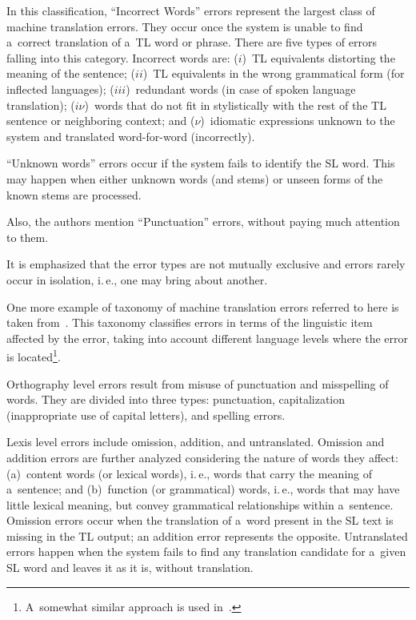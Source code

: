 \begin{multicols}{2}
  In this classification, ``Incorrect Words'' errors represent the largest class of 
machine translation errors. They occur once the system is unable to find a~correct 
translation of a~TL word or phrase. There are five types of errors falling into this 
category. Incorrect words are: ($i$)~TL equivalents distorting the meaning of the 
sentence; ($ii$)~TL equivalents in the wrong grammatical form (for inflected 
languages); ($iii$)~redundant words (in case of spoken language translation); 
($i\nu$)~words that do not fit in stylistically with the rest of the TL sentence or 
neighboring context; and ($\nu$)~idiomatic expressions unknown to the system and 
translated word-for-word (incorrectly).
{ %

}
  
  ``Unknown words'' errors occur if the system fails to identify the SL word. This 
may happen when either unknown words (and stems) or unseen forms of the known 
stems are processed.
  
  Also, the authors mention ``Punctuation'' errors, without paying much attention 
to them.
  
  It is emphasized that the error types are not mutually exclusive and errors rarely 
occur in isolation, i.\,e., one may bring about another.
  
  One more example of taxonomy of machine translation errors  referred to here is 
taken from~\cite{14-n}. This taxonomy classifies errors in terms of the linguistic 
item affected by the error, taking into account different language levels where the 
error is located\footnote{A~somewhat similar approach is used in~\cite{15-n}.}.
  
  Orthography level errors result from misuse of punctuation and misspelling of 
words. They are divided into three types: punctuation, capitalization (inappropriate 
use of capital letters), and spelling errors.
  
  Lexis level errors include omission, addition, and untranslated. Omission and 
addition errors are further analyzed considering the nature of words they affect: 
(a)~content words (or lexical words), i.\,e., words that carry the meaning of 
a~sentence; and (b)~function (or grammatical) words, i.\,e., words that may have little 
lexical meaning, but convey grammatical relationships within a~sentence. Omission 
errors occur when the translation of a~word present in the SL text is missing in the 
TL output; an addition error represents the opposite. Untranslated errors happen 
when the system fails to find any translation candidate for a~given SL word and 
leaves it as it is, without translation.
  

\end{multicols}
